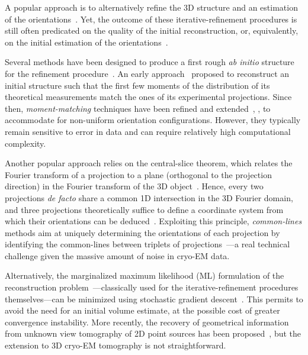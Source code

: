 
A popular approach is to alternatively refine the 3D structure and an estimation of the orientations~\cite{penczek1994ribosome,Baker1996,Dempster1977,sigworth1998maximum,scheres2012bayesian,zehni2020joint}.
Yet, the outcome of these iterative-refinement procedures is still often predicated on the quality of the initial reconstruction, or, equivalently, on the initial estimation of the orientations~\cite{sorzano2006optimization,henderson2012outcome}.

Several methods have been designed to produce a first rough \textit{ab initio} structure for the refinement procedure~\cite{singer2020computational}.
An early approach~\cite{kam1980reconstruction} proposed to reconstruct an initial structure such that the first few moments of the distribution of its theoretical measurements match the ones of its experimental projections.
Since then, \textit{moment-matching} techniques have been refined and extended~\cite{salzman1990method,goncharov1988integral,sharon2019method}, \eg, to accommodate for non-uniform orientation configurations.
However, they typically remain sensitive to error in data and can require relatively high computational complexity.

Another popular approach relies on the central-slice theorem, which relates the Fourier transform of a projection to a plane (orthogonal to the projection direction) in the Fourier transform of the 3D object~\cite{Natterer2001mathematics}.
Hence, every two projections \textit{de facto} share a common 1D intersection in the 3D Fourier domain, and three projections theoretically suffice to define a coordinate system from which their orientations can be deduced~\cite{van1987angular}.
Exploiting this principle, \textit{common-lines} methods aim at uniquely determining the orientations of each projection by identifying the common-lines between triplets of projections~\cite{penczek1994ribosome,mallick2006structure,singer2010detecting,wang2013orientation,greenberg2017common,pragier2019common}---a real technical challenge given the massive amount of noise in cryo-EM data.

Alternatively, the marginalized maximum likelihood (ML) formulation of the reconstruction problem~\cite{sigworth1998maximum}---classically used for the iterative-refinement procedures themselves---can be minimized using stochastic gradient descent~\cite{punjani2017cryosparc}.
This permits to avoid the need for an initial volume estimate, at the possible cost of greater convergence instability.
More recently, the recovery of geometrical information from unknown view tomography of 2D point sources has been proposed~\cite{zehni2019distance}, but the extension to 3D cryo-EM tomography is not straightforward. 

